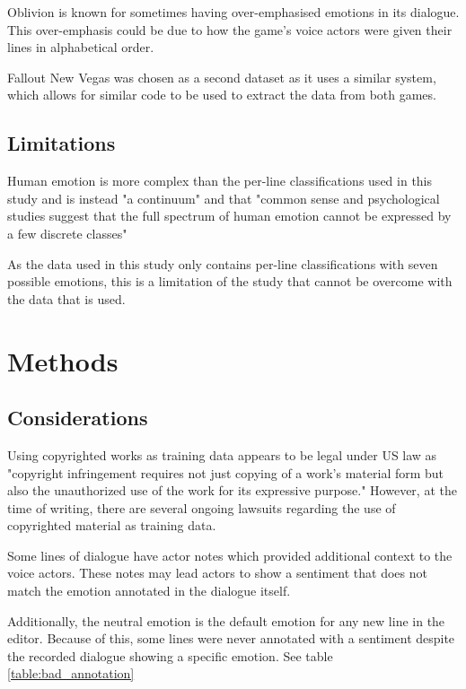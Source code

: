 \documentclass[journal]{IEEEtran}
\begin{document}
Oblivion is known for sometimes having over-emphasised emotions in its dialogue.
This over-emphasis could be due to how the game's voice actors were given their lines
in alphabetical order. \cite[1:00]{noclip_-_video_game_documentaries_music_2018}

Fallout New Vegas was chosen as a second dataset as it uses a similar system, which
allows for similar code to be used to extract the data from both games.

\subsection{Limitations}
Human emotion is more complex than the per-line classifications used in this study and is instead
"a continuum" and that "common sense and psychological studies suggest that the full spectrum of
human emotion cannot be expressed by a few discrete classes" \cite{wollmer_abandoning_2008}

As the data used in this study only contains per-line classifications with seven possible emotions,
this is a limitation of the study that cannot be overcome with the data that is used.

\section{Methods}
\subsection{Considerations}
Using copyrighted works as training data appears to be legal under US law as "copyright
infringement requires not just copying of a work's material form but also the unauthorized
use of the work for its expressive purpose." \cite{quang_does_2021} However, at the time of writing,
there are several ongoing lawsuits regarding the use of copyrighted material as training data. \cite{loving_current_2023}

Some lines of dialogue have actor notes which provided additional context to
the voice actors. These notes may lead actors to show a sentiment that does not
match the emotion annotated in the dialogue itself.

Additionally, the neutral emotion is the default emotion for any new line in the editor.
Because of this, some lines were never annotated with a sentiment despite the recorded
dialogue showing a specific emotion. See table \ref{table:bad_annotation}
\end{document}
